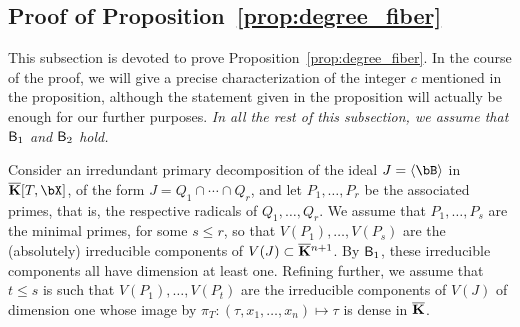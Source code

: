 \documentclass[12pt]{article}
\begin{document}

\subsection{Proof of Proposition~\ref{prop:degree_fiber}}

This subsection is devoted to prove
Proposition~\ref{prop:degree_fiber}. In the course of the proof, we
will give a precise characterization of the integer $c$ mentioned in
the proposition, although the statement given in the proposition will
actually be enough for our further purposes. {\em In all the rest of
  this subsection, we assume that $\mathsf{B}_1$ and $\mathsf{B}_2$ hold.}

Consider an irredundant primary decomposition of the ideal $J=\langle \bB\rangle$ in
$\KKbar[T,\bX]$, of the form $J=Q_1 \cap \cdots
\cap Q_r$, and let $P_1,\dots,P_r$ be the associated primes, that is,
the respective radicals of $Q_1,\dots,Q_r$. We assume that
$P_1,\dots,P_s$ are the minimal primes, for some $s \le r$, so that
$V(P_1),\dots,V(P_s)$ are the (absolutely) irreducible components of
$V(J)\subset \overline{\mathbf{K}}{}^{n+1}$. By $\mathsf{B}_1$, these irreducible
components all have dimension at least one. Refining further, we
assume that $t \le s$ is such that $V(P_1),\dots,V(P_t)$ are the
 irreducible components of $V(J)$ of dimension one whose
image by $\pi_T: (\tau,x_1,\dots,x_n) \mapsto \tau$ is dense in
$\overline{\mathbf{K}}$.
\end{document}
